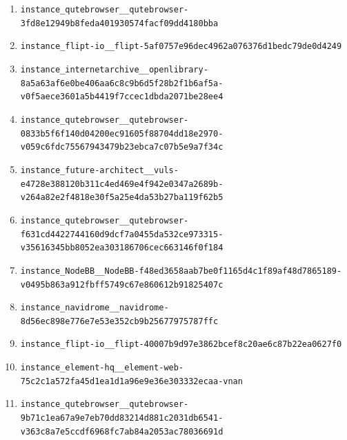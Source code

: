 \begin{enumerate}
\item \texttt{instance\_\allowbreak{}qutebrowser\_\allowbreak{}\_\allowbreak{}qutebrowser-\allowbreak{}3fd8e12949b8fe\allowbreak{}da401930574fac\allowbreak{}f09dd4180bba}
\item \texttt{instance\_\allowbreak{}flipt-\allowbreak{}io\_\allowbreak{}\_\allowbreak{}flipt-\allowbreak{}5af0757e96dec4\allowbreak{}962a076376d1be\allowbreak{}dc79de0d4249}
\item \texttt{instance\_\allowbreak{}internetarchiv\allowbreak{}e\_\allowbreak{}\_\allowbreak{}openlibrary-\allowbreak{}8a5a63af6e0be4\allowbreak{}06aa6c8c9b6d5f\allowbreak{}28b2f1b6af5a-\allowbreak{}v0f5aece3601a5\allowbreak{}b4419f7ccec1db\allowbreak{}da2071be28ee4}
\item \texttt{instance\_\allowbreak{}qutebrowser\_\allowbreak{}\_\allowbreak{}qutebrowser-\allowbreak{}0833b5f6f140d0\allowbreak{}4200ec91605f88\allowbreak{}704dd18e2970-\allowbreak{}v059c6fdc75567\allowbreak{}943479b23ebca7\allowbreak{}c07b5e9a7f34c}
\item \texttt{instance\_\allowbreak{}future-\allowbreak{}architect\_\allowbreak{}\_\allowbreak{}vuls-\allowbreak{}e4728e388120b3\allowbreak{}11c4ed469e4f94\allowbreak{}2e0347a2689b-\allowbreak{}v264a82e2f4818\allowbreak{}e30f5a25e4da53\allowbreak{}b27ba119f62b5}
\item \texttt{instance\_\allowbreak{}qutebrowser\_\allowbreak{}\_\allowbreak{}qutebrowser-\allowbreak{}f631cd44227441\allowbreak{}60d9dcf7a0455d\allowbreak{}a532ce973315-\allowbreak{}v35616345bb805\allowbreak{}2ea303186706ce\allowbreak{}c663146f0f184}
\item \texttt{instance\_\allowbreak{}NodeBB\_\allowbreak{}\_\allowbreak{}NodeBB-\allowbreak{}f48ed3658aab7b\allowbreak{}e0f1165d4c1f89\allowbreak{}af48d7865189-\allowbreak{}v0495b863a912f\allowbreak{}bff5749c67e860\allowbreak{}612b91825407c}
\item \texttt{instance\_\allowbreak{}navidrome\_\allowbreak{}\_\allowbreak{}navidrome-\allowbreak{}8d56ec898e776e\allowbreak{}7e53e352cb9b25\allowbreak{}677975787ffc}
\item \texttt{instance\_\allowbreak{}flipt-\allowbreak{}io\_\allowbreak{}\_\allowbreak{}flipt-\allowbreak{}40007b9d97e386\allowbreak{}2bcef8c20ae6c8\allowbreak{}7b22ea0627f0}
\item \texttt{instance\_\allowbreak{}element-\allowbreak{}hq\_\allowbreak{}\_\allowbreak{}element-\allowbreak{}web-\allowbreak{}75c2c1a572fa45\allowbreak{}d1ea1d1a96e9e3\allowbreak{}6e303332ecaa-\allowbreak{}vnan}
\item \texttt{instance\_\allowbreak{}qutebrowser\_\allowbreak{}\_\allowbreak{}qutebrowser-\allowbreak{}9b71c1ea67a9e7\allowbreak{}eb70dd83214d88\allowbreak{}1c2031db6541-\allowbreak{}v363c8a7e5ccdf\allowbreak{}6968fc7ab84a20\allowbreak{}53ac78036691d}
\end{enumerate}
\endgroup
